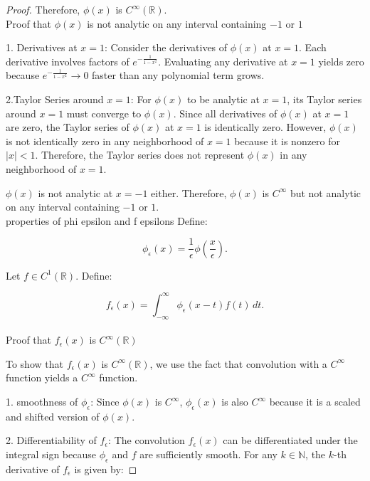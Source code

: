 \documentclass{article}
\begin{document}
\begin{proof}
Therefore, \(\phi(x)\) is \(C^{\infty}(\mathbb{R})\). \\ 



Proof that \(\phi(x)\) is not analytic on any interval containing \(-1\) or \(1\)


1. Derivatives at \(x = 1\): Consider the derivatives of \(\phi(x)\) at \(x = 1\). Each derivative involves factors of \(e^{-\frac{1}{1-x^2}}\). Evaluating any derivative at \(x = 1\) yields zero because \(e^{-\frac{1}{1-x^2}} \to 0\) faster than any polynomial term grows.

2.Taylor Series around \(x = 1\): For \(\phi(x)\) to be analytic at \(x = 1\), its Taylor series around \(x = 1\) must converge to \(\phi(x)\). Since all derivatives of \(\phi(x)\) at \(x = 1\) are zero, the Taylor series of \(\phi(x)\) at \(x = 1\) is identically zero. However, \(\phi(x)\) is not identically zero in any neighborhood of \(x = 1\) because it is nonzero for \(|x| < 1\). Therefore, the Taylor series does not represent \(\phi(x)\) in any neighborhood of \(x = 1\).

 \(\phi(x)\) is not analytic at \(x = -1\) either. Therefore, \(\phi(x)\) is \(C^{\infty}\) but not analytic on any interval containing \(-1\) or \(1\).
\\ 

properties of phi epsilon and f epsilons 
Define:

\[
\phi_\epsilon(x) = \frac{1}{\epsilon} \phi\left(\frac{x}{\epsilon}\right).
\]

Let \(f \in C^1(\mathbb{R})\). Define:

\[
f_\epsilon(x) = \int_{-\infty}^{\infty} \phi_\epsilon(x - t) f(t) \, dt.
\] \\
Proof that \(f_\epsilon(x)\) is \(C^{\infty}(\mathbb{R})\) 

To show that \(f_\epsilon(x)\) is \(C^{\infty}(\mathbb{R})\), we use the fact that convolution with a \(C^{\infty}\) function yields a \(C^{\infty}\) function.

1. smoothness of \(\phi_\epsilon\): Since \(\phi(x)\) is \(C^{\infty}\), \(\phi_\epsilon(x)\) is also \(C^{\infty}\) because it is a scaled and shifted version of \(\phi(x)\).

2. Differentiability of \(f_\epsilon\): The convolution \(f_\epsilon(x)\) can be differentiated under the integral sign because \(\phi_\epsilon\) and \(f\) are sufficiently smooth. For any \(k \in \mathbb{N}\), the \(k\)-th derivative of \(f_\epsilon\) is given by:


\end{proof}
\end{document}
